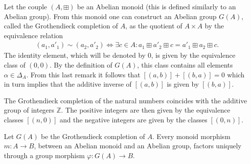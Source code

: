 
    \begin{construct}\label{group:grothendieck_completion}
        Let the couple $(A, \boxplus )$ be an Abelian monoid (this is defined similarly to an Abelian group). From this monoid one can construct an Abelian group $G(A)$, called the Grothendieck completion of $A$, as the quotient of $A\times A$ by the equivalence relation
        \begin{gather}
            (a_1, a'_1)\sim (a_2, a'_2) \iff \exists c\in A: a_1 \boxplus a'_2 \boxplus c = a'_1 \boxplus a_2 \boxplus c.
        \end{gather}
        The identity element, which will be denoted by 0, is given by the equivalence class of $(0, 0)$. By the definition of $G(A)$, this class contains all elements $\alpha\in\Delta_A$. From this last remark it follows that $[(a, b)] + [(b, a)] = 0$ which in turn implies that the additive inverse of $[(a, b)]$ is given by $[(b, a)]$.
    \end{construct}

    \begin{example}
        The Grothendieck completion of the natural numbers coincides with the additive group of integers $\mathbb{Z}$. The positive integers are then given by the equivalence classes $[(n, 0)]$ and the negative integers are given by the classes $[(0, n)]$.
    \end{example}

    \begin{uproperty}
        Let $G(A)$ be the Grothendieck completion of $A$. Every monoid morphism $m:A\rightarrow B$, between an Abelian monoid and an Abelian group, factors uniquely through a group morphism $\varphi:G(A)\rightarrow B$.
    \end{uproperty}

